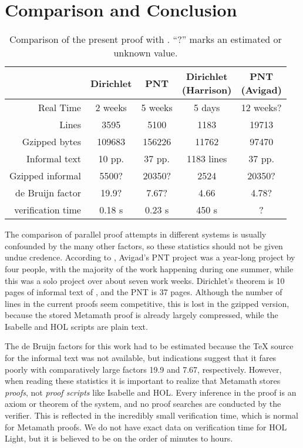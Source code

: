 \documentclass[runningheads,a4paper]{llncs}
\begin{document}
\section{Comparison and Conclusion}\label{sec:conclude}
\begin{table}[t]
  \centering
  \begin{tabular}{r|c|c|c|c|}
    & Dirichlet & PNT & \pbox{20cm}{Dirichlet \\ (Harrison)} & \pbox{20cm}{PNT \\ (Avigad)} \\ \hline
    Real Time & 2 weeks & 5 weeks & 5 days & 12 weeks? \\ \hline
    Lines & 3595 & 5100 & 1183 & 19713 \\ \hline
    Gzipped bytes & 109683 & 156226 & 11762 & 97470 \\ \hline
    Informal text & 10 pp. & 37 pp. & 1183 lines & 37 pp. \\ \hline
    Gzipped informal & 5500? & 20350? & 2524 & 20350? \\ \hline
    de Bruijn factor & 19.9? & 7.67? & 4.66 & 4.78? \\ \hline
    verification time & 0.18 s & 0.23 s & 450 s & ? \\ \hline
  \end{tabular}
  \vspace*{0pt}
  \caption{Comparison of the present proof with \cite{harrdiri,avigad}. ``?'' marks an estimated or unknown value.}
\end{table}

The comparison of parallel proof attempts in different systems is usually confounded by the many other factors, so these statistics should not be given undue credence. According to \cite{avigad}, Avigad's PNT project was a year-long project by four people, with the majority of the work happening during one summer, while this was a solo project over about seven work weeks. Dirichlet's theorem is 10 pages of informal text of \cite{shapiro}, and the PNT is 37 pages. Although the number of lines in the current proofs seem competitive, this is lost in the gzipped version, because the stored Metamath proof is already largely compressed, while the Isabelle and HOL scripts are plain text.

The de Bruijn factors for this work had to be estimated because the TeX source for the informal text was not available, but indications suggest that it fares poorly with comparatively large factors 19.9 and 7.67, respectively. However, when reading these statistics it is important to realize that Metamath stores {\em proofs}, not {\em proof scripts} like Isabelle and HOL. Every inference in the proof is an axiom or theorem of the system, and no proof searches are conducted by the verifier. This is reflected in the incredibly small verification time, which is normal for Metamath proofs. We do not have exact data on verification time for HOL Light, but it is believed to be on the order of minutes to hours.
\end{document}
